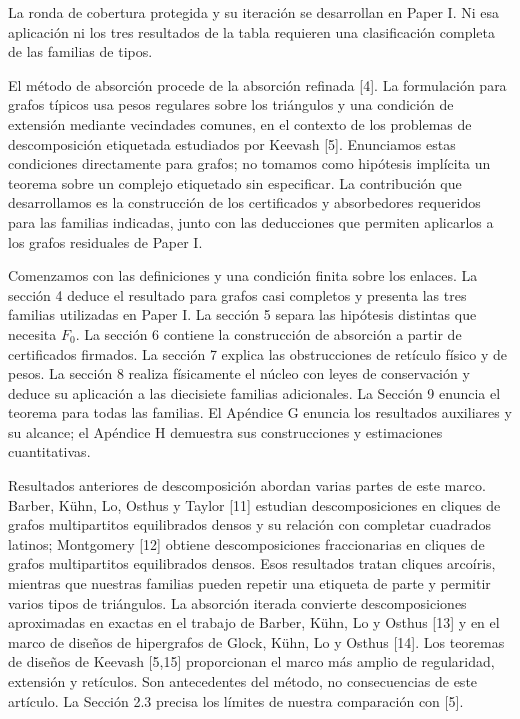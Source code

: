 \documentclass[spanish,11pt,a4paper]{article}
\begin{document}
La ronda de cobertura protegida y su iteración se desarrollan en Paper I. Ni esa aplicación ni los tres resultados de la tabla requieren una clasificación completa de las familias de tipos.

El método de absorción procede de la absorción refinada {[}4{]}. La formulación para grafos típicos usa pesos regulares sobre los triángulos y una condición de extensión mediante vecindades comunes, en el contexto de los problemas de descomposición etiquetada estudiados por Keevash {[}5{]}. Enunciamos estas condiciones directamente para grafos; no tomamos como hipótesis implícita un teorema sobre un complejo etiquetado sin especificar. La contribución que desarrollamos es la construcción de los certificados y absorbedores requeridos para las familias indicadas, junto con las deducciones que permiten aplicarlos a los grafos residuales de Paper I.

Comenzamos con las definiciones y una condición finita sobre los enlaces. La sección 4 deduce el resultado para grafos casi completos y presenta las tres familias utilizadas en Paper I. La sección 5 separa las hipótesis distintas que necesita \(F_0\). La sección 6 contiene la construcción de absorción a partir de certificados firmados. La sección 7 explica las obstrucciones de retículo físico y de pesos. La sección 8 realiza físicamente el núcleo con leyes de conservación y deduce su aplicación a las diecisiete familias adicionales. La Sección 9 enuncia el teorema para todas las familias. El Apéndice G enuncia los resultados auxiliares y su alcance; el Apéndice H demuestra sus construcciones y estimaciones cuantitativas.

Resultados anteriores de descomposición abordan varias partes de este marco. Barber, Kühn, Lo, Osthus y Taylor {[}11{]} estudian descomposiciones en cliques de grafos multipartitos equilibrados densos y su relación con completar cuadrados latinos; Montgomery {[}12{]} obtiene descomposiciones fraccionarias en cliques de grafos multipartitos equilibrados densos. Esos resultados tratan cliques arcoíris, mientras que nuestras familias pueden repetir una etiqueta de parte y permitir varios tipos de triángulos. La absorción iterada convierte descomposiciones aproximadas en exactas en el trabajo de Barber, Kühn, Lo y Osthus {[}13{]} y en el marco de diseños de hipergrafos de Glock, Kühn, Lo y Osthus {[}14{]}. Los teoremas de diseños de Keevash {[}5,15{]} proporcionan el marco más amplio de regularidad, extensión y retículos. Son antecedentes del método, no consecuencias de este artículo. La Sección 2.3 precisa los límites de nuestra comparación con {[}5{]}.
\end{document}
